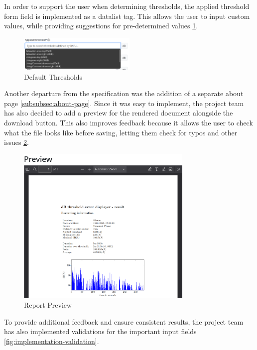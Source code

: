 In order to support the user when determining thresholds, the applied threshold form field is implemented as a datalist tag. This allows the user to input custom values, while
providing suggestions for pre-determined values \ref{fig:implementation-threshold}.
\begin{figure}[H]
    \centering
    \includegraphics[width=0.5\textwidth]{../assets/implementation_threshold.png}
    \caption{Default Thresholds}\label{fig:implementation-threshold}
\end{figure}
Another departure from the specification was the addition of a separate about page \ref{subsubsec:about-page}. Since it was easy to implement,
the project team has also decided to add a preview for the rendered document alongside the download button. This also improves feedback because it allows the user to
check what the file looks like before saving, letting them check for typos and other issues \ref{fig:implementation-preview}.
\begin{figure}[H]
    \centering
    \includegraphics[width=0.75\textwidth]{../assets/implementation_preview.png}
    \caption{Report Preview}\label{fig:implementation-preview}
\end{figure}
To provide additional feedback and ensure consistent results, the project team has also implemented
validations for the important input fields \ref{fig:implementation-validation}.
